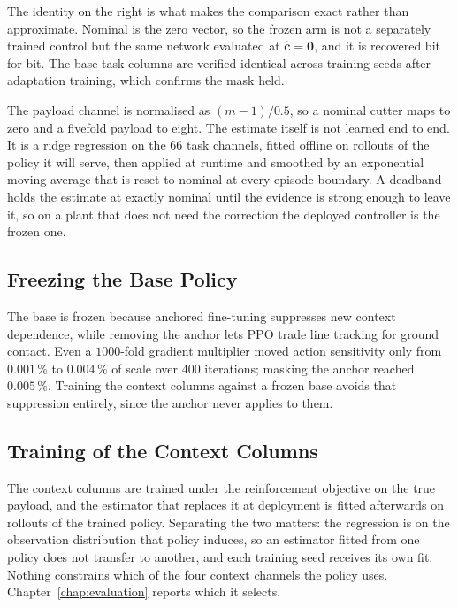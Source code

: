 The identity on the right is what makes the comparison exact rather than
approximate. Nominal is the zero vector, so the frozen arm is not a separately
trained control but the same network evaluated at $\hat{\bm{c}} = \bm{0}$, and
it is recovered bit for bit. The base task columns are verified identical across
training seeds after adaptation training, which confirms the mask held.

The payload channel is normalised as $(m - 1)/0.5$, so a nominal cutter maps to
zero and a fivefold payload to eight. The estimate itself is not learned end to
end. It is a ridge regression on the $66$ task channels, fitted offline on
rollouts of the policy it will serve, then applied at runtime and smoothed by an
exponential moving average that is reset to nominal at every episode boundary.
A deadband holds the estimate at exactly nominal until the evidence is strong
enough to leave it, so on a plant that does not need the correction the deployed
controller is the frozen one.

\subsection{Freezing the Base Policy}
\label{sec:ctrl:af-frozen}

The base is frozen because anchored fine-tuning suppresses new context
dependence, while removing the anchor lets PPO trade line tracking for ground
contact. Even a $1000$-fold gradient multiplier moved action sensitivity only
from $0.001\,\%$ to $0.004\,\%$ of scale over $400$ iterations; masking the
anchor reached $0.005\,\%$. Training the context columns against a frozen base
avoids that suppression entirely, since the anchor never applies to them.

\subsection{Training of the Context Columns}
\label{sec:ctrl:af-encoder}

The context columns are trained under the reinforcement objective on the true
payload, and the estimator that replaces it at deployment is fitted afterwards
on rollouts of the trained policy. Separating the two matters: the regression
is on the observation distribution that policy induces, so an estimator fitted
from one policy does not transfer to another, and each training seed receives
its own fit. Nothing constrains which of the four context channels the policy
uses. Chapter~\ref{chap:evaluation} reports which it selects.

